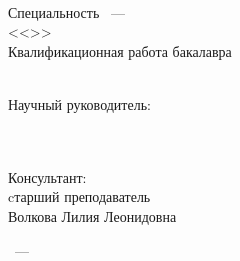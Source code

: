 
\thispagestyle{empty}%
\begin{center}%
    \MakeUppercase{\thesisOrganization}
\end{center}%

\vspace{0pt plus1fill} %
\begin{center}%
    {\large \thesisAuthor}
\end{center}%

\vspace{0pt plus1fill} %
\begin{center}%
    \textbf {\large \thesisTitle} \\
    \vspace{0pt plus4fill} %
    {%
        Специальность \thesisSpecialtyNumber~--- \\
        <<\thesisSpecialtyTitle>> \\
    }
    \vspace{0pt plus4fill} %
    {
        Квалификационная работа бакалавра \\
        \thesisDegree \\
    }
\end{center}%

\vspace{0pt plus6fill} %
\begin{flushright}%
    Научный руководитель: \\
    \supervisorRegalia \\
    \supervisorFio \\
\end{flushright}%

\vspace{0pt plus1fill} %
\begin{flushright}%
    Консультант: \\
    cтарший преподаватель \\
    Волкова Лилия Леонидовна \\
\end{flushright}%

\vspace{0pt plus4fill} %
\begin{center}%
    {\thesisCity~--- \thesisYear}
\end{center}%

\newpage
